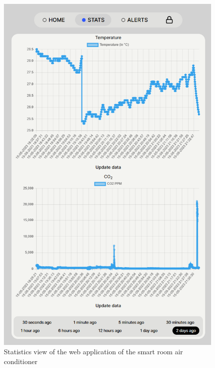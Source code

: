 \begin{figure}
  \centerline{\includegraphics[scale=0.4]{resources/webapp-stats-view.png}}
  \caption{Statistics view of the web application of the smart room air conditioner}
  \label{webapp-stats-view}
\end{figure}

